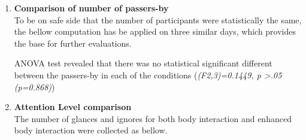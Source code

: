\begin{enumerate}
\item \textbf{Comparison of number of passers-by} \\

To be on safe side that the number of participants were statistically the same, the bellow computation has be applied on three similar days, which provides the base for further evaluations.

\begin{table}[H]
\caption{Number of people for three conditions}
\label{tab:newbodypasserbyofthreeweeks}
\centering
{}
\end{table}

ANOVA test revealed that there was no statistical significant different between the passers-by in each of the conditions (\emph{(F2,3)=0.1449, p >.05 (p=0.868)})



\item \textbf{Attention Level comparison}  \\
The number of glances and ignores for both body interaction and enhanced body interaction were collected as bellow.


\begin{table}[H]
\caption{Cross tabulation for each condition attention level}
\label{tab:newbodycrosstabulationweeks}
\centering
{}
\end{table}



\end{enumerate}
